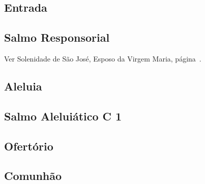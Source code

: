 
\subsection{Entrada}\label{subsection:communia/commune-dedicationis-ecclesiae/introitus}

\subsection{Salmo Responsorial}
\begin{rubrica}
  Ver Solenidade de São José, Esposo da Virgem Maria, página~\pageref{subsection:proprium-sanctorum/sancti-ioseph-sponsi-bmv/psalmus-responsorius}.
\end{rubrica}

\subsection{Aleluia}\label{subsection:communia/commune-dedicationis-ecclesiae/alleluia}

\AllowPageFlush

\subsection{Salmo Aleluiático \textmd{C 1}}\label{subsection:communia/commune-dedicationis-ecclesiae/psalmus-alleluiaticus}

\AllowPageFlush

\subsection{Ofertório}\label{subsection:communia/commune-dedicationis-ecclesiae/offertorium}

\AllowPageFlush

\subsection{Comunhão}\label{subsection:communia/commune-dedicationis-ecclesiae/communio}
